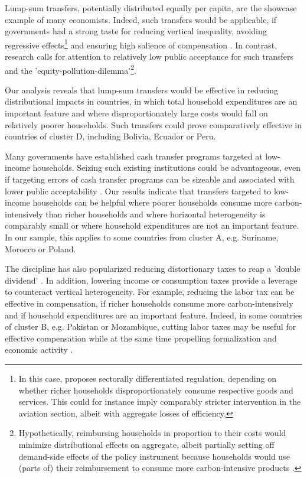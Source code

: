 \documentclass[12pt, a4paper]{article}
\begin{document}
Lump-sum transfers, potentially distributed equally per capita, are the showcase example of many economists. Indeed, such transfers would be applicable, if governments had a strong taste for reducing vertical inequality, avoiding regressive effects\footnote{In this case, \textcite{Stiglitz.2019} proposes sectorally differentiated regulation, depending on whether richer households disproportionately consume respective goods and services. This could for instance imply comparably stricter intervention in the aviation section, albeit with aggregate losses of efficiency.} and ensuring high salience of compensation \autocite{Chetty.2009}. In contrast, research calls for attention to relatively low public acceptance for such transfers and the 'equity-pollution-dilemma'\footnote{Hypothetically, reimbursing households in proportion to their costs would minimize distributional effects on aggregate, albeit partially setting off demand-side effects of the policy instrument because households would use (parts of) their reimbursement to consume more carbon-intensive products \autocite[see also][]{Stiglitz.2019}.}\autocite{Sager.2019}.

Our analysis reveals that lump-sum transfers would be effective in reducing distributional impacts in countries, in which total household expenditures are an important feature and where disproportionately large costs would fall on relatively poorer households. Such transfers could prove comparatively effective in countries of cluster D, including Bolivia, Ecuador or Peru. %

Many governments have established cash transfer programs targeted at low-income households. Seizing such existing institutions could be advantageous, even if targeting errors of cash transfer programs can be sizeable \autocite{Banerjee.2022} and associated with lower public acceptability \autocite{Bah.2019}. Our results indicate that transfers targeted to low-income households can be helpful where poorer households consume more carbon-intensively than richer households and where horizontal heterogeneity is comparably small or where household expenditures are not an important feature. In our sample, this applies to some countries from cluster A, e.g. Suriname, Morocco or Poland.

The discipline has also popularized reducing distortionary taxes to reap a 'double dividend' \autocite{Bovenberg.1996}. In addition, lowering income or consumption taxes provide a leverage to counteract vertical heterogeneity. For example, reducing the labor tax can be effective in compensation, if richer households consume more carbon-intensively and if household expenditures are an important feature. Indeed, in some countries of cluster B, e.g. Pakistan or Mozambique, cutting labor taxes may be useful for effective compensation while at the same time propelling formalization \autocite{Jessen.2021,Rocha.2018} and economic activity \autocite{Ulyssea.2018}.
\end{document}
